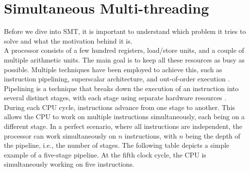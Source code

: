 \section{Simultaneous Multi-threading}
Before we dive into \ac{SMT}, it is important to understand which problem it  
tries to solve and what the motivation behind it is. \\
A processor consists of a few hundred registers, load/store units, and a couple of multiple arithmetic units. 
The main goal is to keep all these resources as busy as possible. Multiple techniques have been 
employed to achieve this, such as instruction pipelining, superscalar architecture, and out-of-order execution 
\cite{SMT_Maximizing_on_chip_parallelism}.
Pipelining is a technique that breaks down the execution of an instruction into several distinct 
stages, with each stage using separate hardware resources \cite{SMT_under_the_hood}. During each CPU cycle, 
instructions advance from one stage to another. This allows the CPU to work on multiple instructions 
simultaneously, each being on a different stage. In a perfect scenario, where all instructions are 
independent, the processor can work simultaneously on \begin{math}n\end{math} instructions, 
with \begin{math}n\end{math} being the depth of the pipeline, i.e., the number of stages. 
The following table depicts a simple example of a five-stage pipeline. At the fifth clock cycle, 
the CPU is simultaneously working on five instructions.  

